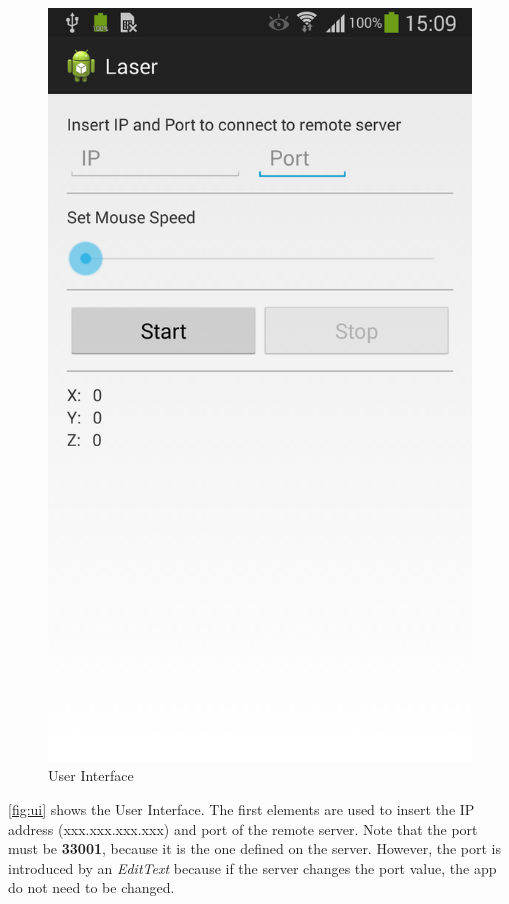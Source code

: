 \documentclass{llncs}
\begin{document}
\begin{figure}[h]
 \centering
 \includegraphics[scale=0.18]{figures/screenshot.png}
 \caption{User Interface}
 \label{fig:ui}
\end{figure}

\autoref{fig:ui} shows the User Interface. The first elements are used to insert the IP address (xxx.xxx.xxx.xxx) and port of the remote server. Note that the port must be \textbf{33001}, because it is the one defined on the server. However, the port is introduced by an \textit{EditText} because if the server changes the port value, the app do not need to be changed.
\end{document}
